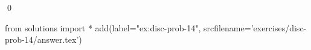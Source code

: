 
\begin{ex} 
  \label{ex:disc-prob-14}
  
  \qed
\end{ex} 
\begin{python0}
from solutions import *
add(label="ex:disc-prob-14",
    srcfilename='exercises/disc-prob-14/answer.tex') 
\end{python0}
